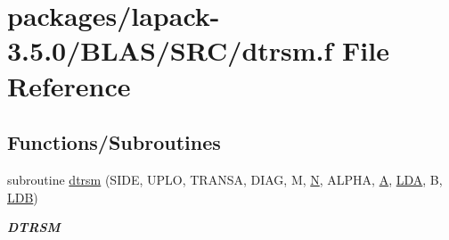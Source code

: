 \hypertarget{lapack-3_85_80_2BLAS_2SRC_2dtrsm_8f}{}\section{packages/lapack-\/3.5.0/\+B\+L\+A\+S/\+S\+R\+C/dtrsm.f File Reference}
\label{lapack-3_85_80_2BLAS_2SRC_2dtrsm_8f}
\subsection*{Functions/\+Subroutines}
\begin{DoxyCompactItemize}
\item 
subroutine \hyperlink{group__double__blas__level3_ga6a0a7704f4a747562c1bd9487e89795c}{dtrsm} (S\+I\+D\+E, U\+P\+L\+O, T\+R\+A\+N\+S\+A, D\+I\+A\+G, M, \hyperlink{polmisc_8c_a0240ac851181b84ac374872dc5434ee4}{N}, A\+L\+P\+H\+A, \hyperlink{classA}{A}, \hyperlink{example__user_8c_ae946da542ce0db94dced19b2ecefd1aa}{L\+D\+A}, B, \hyperlink{example__user_8c_a50e90a7104df172b5a89a06c47fcca04}{L\+D\+B})
\begin{DoxyCompactList}\small\item\em {\bfseries D\+T\+R\+S\+M} \end{DoxyCompactList}\end{DoxyCompactItemize}
